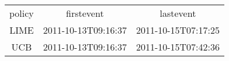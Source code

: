 \begin{tabular}{ccc}
policy & firstevent & lastevent\\
LIME & 2011-10-13T09:16:37 & 2011-10-15T07:17:25\\
UCB & 2011-10-13T09:16:37 & 2011-10-15T07:42:36\\
\end{tabular}
